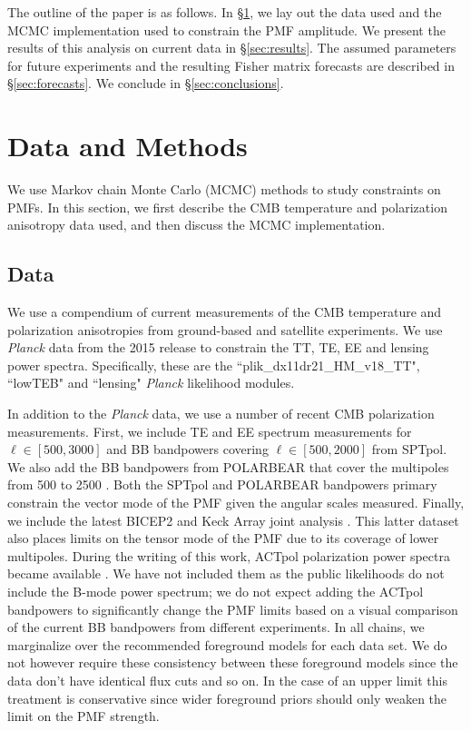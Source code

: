 \documentclass[preprint]{emulateapj}
\newcommand{\planck}{{\sl Planck}}
\newcommand{\pb}{POLARBEAR}
\newcommand{\sptpol}{SPTpol}
\begin{document}
The outline of the paper is as follows. 
In \S\ref{sec:data}, we lay out the data used and the MCMC implementation used to constrain the PMF amplitude. 
We present the results of this analysis on current data in \S\ref{sec:results}. 
The assumed parameters for future experiments and the resulting Fisher matrix forecasts are described in \S\ref{sec:forecasts}. 
We conclude in \S\ref{sec:conclusions}. 

\section{Data and Methods}
\label{sec:data}

We use  Markov chain Monte Carlo (MCMC) methods to study constraints on PMFs. 
In this section, we first describe the CMB temperature and polarization anisotropy data used, and then discuss the MCMC implementation. 




\subsection{Data}

We use a compendium of current measurements of the CMB temperature and polarization anisotropies from ground-based and satellite experiments. 
We use \planck{} data from the 2015 release to constrain the TT, TE, EE and lensing power spectra. 
Specifically, these are the ``plik\_dx11dr21\_HM\_v18\_TT", ``lowTEB" and ``lensing" \planck{} likelihood modules. 


In addition to the \planck{} data, we use a number of recent CMB polarization measurements. 
First, we include TE and EE spectrum measurements\citep{crites15} for $\ell \in [500,3000]$ and BB bandpowers covering $\ell \in [500,2000]$ \citep{keisler15} from SPTpol. 
We also add the BB bandpowers from \pb{} that cover the multipoles from 500 to 2500 \citep{polarbear14b}. 
Both the \sptpol{} and \pb{} bandpowers primary constrain the vector mode of the PMF given the angular scales measured. 
Finally, we include the latest BICEP2 and Keck Array  joint analysis \citep{bicepkeck15}. 
This latter dataset also places limits on the tensor mode of the PMF due to its coverage of lower multipoles. 
During the writing of this work, ACTpol polarization power spectra became available \citep{naess14,louis16}. 
We have not included them as the public likelihoods do not include the B-mode power spectrum; we do not expect adding the ACTpol bandpowers to significantly change the PMF limits based on a visual comparison of the current BB bandpowers from different experiments.
In all chains, we marginalize over the recommended foreground models for each data set. 
We do not however require these consistency between these foreground models since the data don't have identical flux cuts and so on. 
In the case of an upper limit this treatment is conservative since wider foreground priors should only weaken the limit on the PMF strength. 
\end{document}

